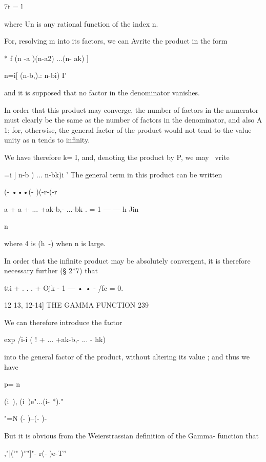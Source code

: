7t = l 

where Un is any rational function of the index n. 

For, resolving m  into its factors, we can Avrite the product in the form 

* f   (n -a )(n-a2) ...(n- ak) ] 

n=i[ (n-b,).: n-bi) I' 

and it is supposed that no factor in the denominator vanishes. 

In order that this product may converge, the number of factors in the 
numerator must clearly be the same as the number of factors in the 
denominator, and also A  1; for, otherwise, the general factor of the product 
would not tend to the value unity as n tends to infinity. 

We have therefore k= I, and, denoting the product by P, we may \ vrite 

 =i ] n-b ) ...  n-bk)i ' 
The general term in this product can be written 

(- •••(-  )(-r-(-r 

a  + a + ... +ak-b,- ...-bk . 
= 1 — — h Jin  

n 

where  4  is (h~-) when n is large. 

In order that the infinite product may be absolutely convergent, it is 
therefore necessary further (§ 2*7) that 

tti + . . . + Ojk -  1 — • •   -  /fc = 0. 



12 13, 12-14] THE GAMMA FUNCTION 239 

We can therefore introduce the factor 



exp  /i-i ( ! + ... +ak-b,- ... - hk) 



into the general factor of the product, without altering its value ; and thus 
we have 



p= n 



(i\   ), (i\  )e"...(i- *)." 



"=N (- )--(- )- 



But it is obvious from the Weierstrassian definition of the Gamma- 
function that 



,"|('" )''"]"- r(- )e-T'' 



